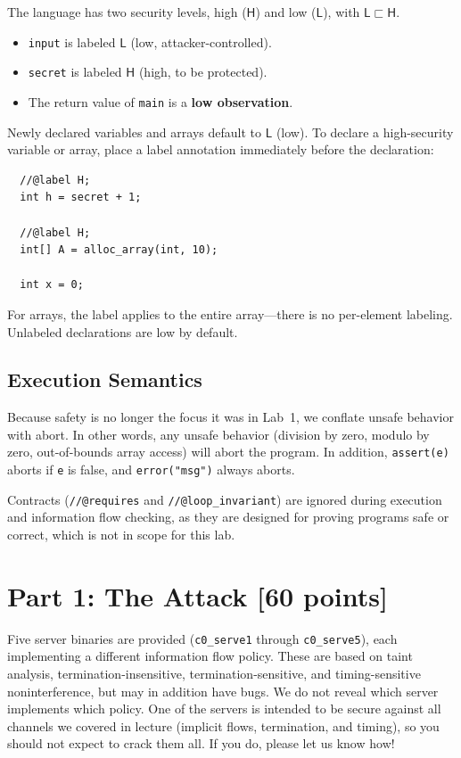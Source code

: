 \documentclass[11pt]{article}
\newcommand{\ms}[1]{\mathsf{#1}}
\begin{document}
The language has two security levels, high ($\ms{H}$) and low ($\ms{L}$),
with $\ms{L} \sqsubset \ms{H}$.
\begin{itemize}
  \item \texttt{input} is labeled $\ms{L}$ (low, attacker-controlled).
  \item \texttt{secret} is labeled $\ms{H}$ (high, to be protected).
  \item The return value of \texttt{main} is a \textbf{low observation}.
\end{itemize}

Newly declared variables and arrays default to $\ms{L}$ (low).  To declare a
high-security variable or array, place a label annotation immediately before the
declaration:
\begin{verbatim}
  //@label H;
  int h = secret + 1;

  //@label H;
  int[] A = alloc_array(int, 10);

  int x = 0;
\end{verbatim}
For arrays, the label applies to the entire array---there is no per-element labeling.
Unlabeled declarations are low by default.

\subsection{Execution Semantics}

Because safety is no longer the focus it was in Lab~1, we conflate unsafe
behavior with abort.  In other words, any unsafe behavior (division by zero,
modulo by zero, out-of-bounds array access) will abort the
program.  In addition, \verb'assert(e)' aborts if \verb'e' is false, and
\verb'error("msg")' always aborts.

Contracts (\verb'//@requires' and \verb'//@loop_invariant') are ignored during
execution and information flow checking, as they are designed for proving
programs safe or correct, which is not in scope for this lab.

\section{Part 1: The Attack [60 points]}

Five server binaries are provided (\verb'c0_serve1' through \verb'c0_serve5'),
each implementing a different information flow policy.  These are based on taint
analysis, termination-insensitive, termination-sensitive, and timing-sensitive
noninterference, but may in addition have bugs.  We do not reveal which server
implements which policy.  One of the servers is intended to be secure against
all channels we covered in lecture (implicit flows, termination, and timing),
so you should not expect to crack them all.  If you do, please let us know how!
\end{document}
